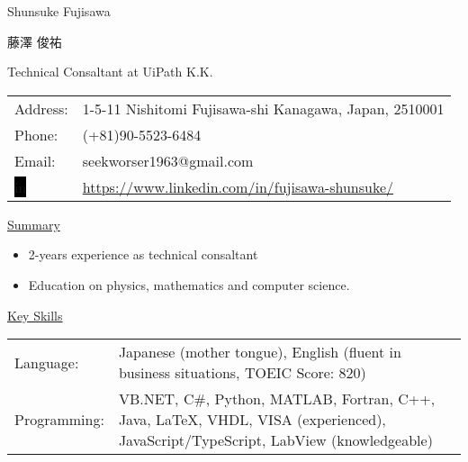 \documentclass[a4paper,12pt]{ltjsarticle}
\begin{document}
\pagestyle{empty}
\begin{multicols}{2}
\setlength{\columnsep}{4pt}
\setlength{\tabcolsep}{2pt}

\huge
\noindent
\textsf{Shunsuke Fujisawa}\par\noindent
\textsf{藤澤 俊祐}\par\noindent
\columnbreak
\normalsize
\color{gray}
Technical Consaltant at UiPath K.K.\par\noindent
\color{black}
\small
\begin{tabularx}{0.9\linewidth}{lX}
Address:&1-5-11 Nishitomi Fujisawa-shi Kanagawa, Japan, 2510001\\
Phone:& (+81)90-5523-6484\\
Email:&seekworser1963@gmail.com\\
\color{white}
\colorbox{black}{\textsf{in}}&\url{https://www.linkedin.com/in/fujisawa-shunsuke/}
\end{tabularx}
\end{multicols}

\Large\noindent
\uline{\textsf{Summary}\hspace{\fill}}
\normalsize\par\noindent

\begin{itemize}
    \item 2-years experience as technical consaltant
    \item Education on physics, mathematics and computer science.
\end{itemize}

\Large\noindent
\uline{\textsf{Key Skills}\hspace{\fill}}
\normalsize\par\noindent
\begin{tabularx}{0.9\linewidth}{lX}
    Language:&Japanese (mother tongue), English (fluent in business situations, TOEIC Score: 820)\\
    Programming:&VB.NET, C\#, Python, MATLAB, Fortran, C++, Java, LaTeX, VHDL, VISA (experienced), JavaScript/TypeScript, LabView (knowledgeable)
\end{tabularx}
\end{document}
